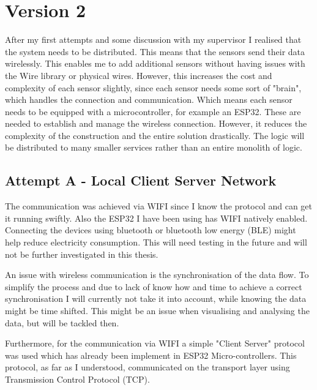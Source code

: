 \chapter*{Version 2}
\label{chap:Technical CHallenges}
\renewcommand{\thesection}{\arabic{section}}
\setcounter{section}{0}

After my first attempts and some discussion with my supervisor I realised that the system needs to be distributed. This means that the sensors send their data wirelessly. This enables me to add additional sensors without having issues with the Wire library or physical wires. However, this increases the cost and complexity of each sensor slightly, since each sensor needs some sort of "brain", which handles the connection and communication. Which means each sensor needs to be equipped with a microcontroller, for example an ESP32. These are needed to establish and manage the wireless connection.
However, it reduces the complexity of the construction and the entire solution drastically. The logic will be distributed to many smaller services rather than an entire monolith of logic. 

\section{Attempt A - Local Client Server Network}

The communication was achieved via WIFI since I know the protocol and can get it running swiftly. Also the ESP32 I have been using has WIFI natively enabled. Connecting the devices using bluetooth or bluetooth low energy (BLE) might help reduce electricity consumption. This will need testing in the future and will not be further investigated in this thesis.

An issue with wireless communication is the synchronisation of the data flow. To simplify the process and due to lack of know how and time to achieve a correct synchronisation I will currently not take it into account, while knowing the data might be time shifted. 
This might be an issue when visualising and analysing the data, but will be tackled then.

Furthermore, for the communication via WIFI a simple "Client Server" protocol was used which has already been implement in ESP32 Micro-controllers. This protocol, as far as I understood, communicated on the transport layer using Transmission Control Protocol (TCP). \cite{arduinoi4:online} \cite{ESP32Ser71:online}

